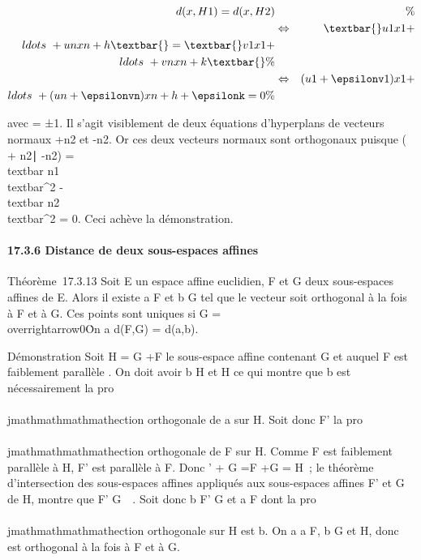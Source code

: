 \begin{align*} d(x,H1) =
d(x,H2)&& \%& \\ &
\Leftrightarrow & \textbar{}u1x1 +
\\ldots~ +
unxn + h\textbar{} =
\textbar{}v1x1 +
\\ldots~ +
vnxn + k\textbar{}\%&
\\ & \Leftrightarrow &
(u1 + \epsilonv1)x1 +
\\ldots~ +
(un + \epsilonvn)xn + h + \epsilonk = 0 \%&
\\ \end{align*}

avec \epsilon = ±1. Il s'agit visiblement de deux équations d'hyperplans de
vecteurs normaux 
+\overrightarrow n2 et
-\overrightarrow n2. Or ces deux vecteurs
normaux sont orthogonaux puisque
(
+\overrightarrow
n2∣
-\overrightarrow n2)
=\\textbar{}\overrightarrow
n1\\textbar{}^2
-\\textbar{}\overrightarrow
n2\\textbar{}^2 = 0. Ceci achève la
démonstration.

\paragraph{17.3.6 Distance de deux sous-espaces affines}

Théorème~17.3.13 Soit E un espace affine euclidien, F et G deux
sous-espaces affines de E. Alors il existe a \in F et b \in G tel que le
vecteur \overrightarrowab soit orthogonal à la fois à
F et à G. Ces points sont uniques si \overrightarrowF
\bigcap\overrightarrow G =
\\overrightarrow0\.
On a d(F,G) = d(a,b).

Démonstration Soit H = G +\overrightarrow F le
sous-espace affine contenant G et auquel F est faiblement parallèle . On
doit avoir b \in H et \overrightarrowab \bot H ce qui
montre que b est nécessairement la pro\\\\jmathmathmathmathection orthogonale de a sur H.
Soit donc F' la pro\\\\jmathmathmathmathection orthogonale de F sur H. Comme F est
faiblement parallèle à H, F' est parallèle à F. Donc
\overrightarrowF' +\overrightarrow
G =\overrightarrow F
+\overrightarrow G =\overrightarrow
H~; le théorème d'intersection des sous-espaces affines appliqués aux
sous-espaces affines F' et G de H, montre que F' \bigcap
G\neq~\varnothing~. Soit donc b \in F' \bigcap G et a \in F dont la
pro\\\\jmathmathmathmathection orthogonale sur H est b. On a a \in F, b \in G et
\overrightarrowab \bot H, donc
\overrightarrowab est orthogonal à la fois à F et à
G.

